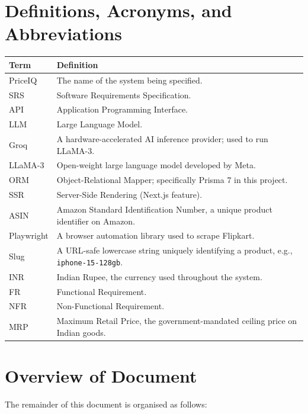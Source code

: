 \documentclass[12pt,a4paper]{report}
\begin{document}
\section{Definitions, Acronyms, and Abbreviations}

\begin{longtable}{L{2.8cm} L{10cm}}
  \toprule
  \textbf{Term} & \textbf{Definition} \\
  \midrule
  \endhead
  PriceIQ & The name of the system being specified. \\
  SRS & Software Requirements Specification. \\
  API & Application Programming Interface. \\
  LLM & Large Language Model. \\
  Groq & A hardware-accelerated AI inference provider; used to run LLaMA-3. \\
  LLaMA-3 & Open-weight large language model developed by Meta. \\
  ORM & Object-Relational Mapper; specifically Prisma 7 in this project. \\
  SSR & Server-Side Rendering (Next.js feature). \\
  ASIN & Amazon Standard Identification Number, a unique product identifier on Amazon. \\
  Playwright & A browser automation library used to scrape Flipkart. \\
  Slug & A URL-safe lowercase string uniquely identifying a product, e.g., \texttt{iphone-15-128gb}. \\
  INR & Indian Rupee, the currency used throughout the system. \\
  FR & Functional Requirement. \\
  NFR & Non-Functional Requirement. \\
  MRP & Maximum Retail Price, the government-mandated ceiling price on Indian goods. \\
  \bottomrule
\end{longtable}

\section{Overview of Document}
The remainder of this document is organised as follows:
\end{document}
